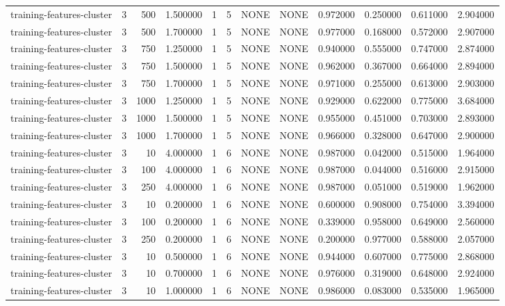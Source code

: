\begin{tabular}{lrrrllllrrrr}
training-features-cluster & 3 & 500 & 1.500000 & 1 & 5 & NONE & NONE & 0.972000 & 0.250000 & 0.611000 & 2.904000 \\
training-features-cluster & 3 & 500 & 1.700000 & 1 & 5 & NONE & NONE & 0.977000 & 0.168000 & 0.572000 & 2.907000 \\
training-features-cluster & 3 & 750 & 1.250000 & 1 & 5 & NONE & NONE & 0.940000 & 0.555000 & 0.747000 & 2.874000 \\
training-features-cluster & 3 & 750 & 1.500000 & 1 & 5 & NONE & NONE & 0.962000 & 0.367000 & 0.664000 & 2.894000 \\
training-features-cluster & 3 & 750 & 1.700000 & 1 & 5 & NONE & NONE & 0.971000 & 0.255000 & 0.613000 & 2.903000 \\
training-features-cluster & 3 & 1000 & 1.250000 & 1 & 5 & NONE & NONE & 0.929000 & 0.622000 & 0.775000 & 3.684000 \\
training-features-cluster & 3 & 1000 & 1.500000 & 1 & 5 & NONE & NONE & 0.955000 & 0.451000 & 0.703000 & 2.893000 \\
training-features-cluster & 3 & 1000 & 1.700000 & 1 & 5 & NONE & NONE & 0.966000 & 0.328000 & 0.647000 & 2.900000 \\
training-features-cluster & 3 & 10 & 4.000000 & 1 & 6 & NONE & NONE & 0.987000 & 0.042000 & 0.515000 & 1.964000 \\
training-features-cluster & 3 & 100 & 4.000000 & 1 & 6 & NONE & NONE & 0.987000 & 0.044000 & 0.516000 & 2.915000 \\
training-features-cluster & 3 & 250 & 4.000000 & 1 & 6 & NONE & NONE & 0.987000 & 0.051000 & 0.519000 & 1.962000 \\
training-features-cluster & 3 & 10 & 0.200000 & 1 & 6 & NONE & NONE & 0.600000 & 0.908000 & 0.754000 & 3.394000 \\
training-features-cluster & 3 & 100 & 0.200000 & 1 & 6 & NONE & NONE & 0.339000 & 0.958000 & 0.649000 & 2.560000 \\
training-features-cluster & 3 & 250 & 0.200000 & 1 & 6 & NONE & NONE & 0.200000 & 0.977000 & 0.588000 & 2.057000 \\
training-features-cluster & 3 & 10 & 0.500000 & 1 & 6 & NONE & NONE & 0.944000 & 0.607000 & 0.775000 & 2.868000 \\
training-features-cluster & 3 & 10 & 0.700000 & 1 & 6 & NONE & NONE & 0.976000 & 0.319000 & 0.648000 & 2.924000 \\
training-features-cluster & 3 & 10 & 1.000000 & 1 & 6 & NONE & NONE & 0.986000 & 0.083000 & 0.535000 & 1.965000 \\

\end{tabular}
